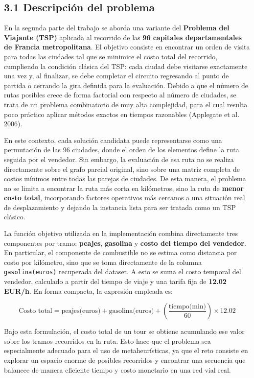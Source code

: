 \documentclass[
  12pt,
  letterpaper,
  DIV=11,
  numbers=noendperiod]{scrartcl}
\begin{document}
\subsection{3.1 Descripción del
problema}\label{descripciuxf3n-del-problema}

En la segunda parte del trabajo se aborda una variante del
\textbf{Problema del Viajante (TSP)} aplicada al recorrido de las
\textbf{96 capitales departamentales de Francia metropolitana}. El
objetivo consiste en encontrar un orden de visita para todas las
ciudades tal que se minimice el costo total del recorrido, cumpliendo la
condición clásica del TSP: cada ciudad debe visitarse exactamente una
vez y, al finalizar, se debe completar el circuito regresando al punto
de partida o cerrando la gira definida para la evaluación. Debido a que
el número de rutas posibles crece de forma factorial con respecto al
número de ciudades, se trata de un problema combinatorio de muy alta
complejidad, para el cual resulta poco práctico aplicar métodos exactos
en tiempos razonables (Applegate et al. 2006).

En este contexto, cada solución candidata puede representarse como una
permutación de las 96 ciudades, donde el orden de los elementos define
la ruta seguida por el vendedor. Sin embargo, la evaluación de esa ruta
no se realiza directamente sobre el grafo parcial original, sino sobre
una matriz completa de costos mínimos entre todas las parejas de
ciudades. De esta manera, el problema no se limita a encontrar la ruta
más corta en kilómetros, sino la ruta de \textbf{menor costo total},
incorporando factores operativos más cercanos a una situación real de
desplazamiento y dejando la instancia lista para ser tratada como un TSP
clásico.

La función objetivo utilizada en la implementación combina directamente
tres componentes por tramo: \textbf{peajes}, \textbf{gasolina} y
\textbf{costo del tiempo del vendedor}. En particular, el componente de
combustible no se estima como distancia por costo por kilómetro, sino
que se toma directamente de la columna \texttt{gasolina(euros)}
recuperada del dataset. A esto se suma el costo temporal del vendedor,
calculado a partir del tiempo de viaje y una tarifa fija de
\textbf{12.02 EUR/h}. En forma compacta, la expresión empleada es:

\[
\text{Costo total} = \text{peajes(euros)} + \text{gasolina(euros)} + \left(\frac{\text{tiempo(min)}}{60}\right)\times 12.02
\]

Bajo esta formulación, el costo total de un tour se obtiene acumulando
ese valor sobre los tramos recorridos en la ruta. Esto hace que el
problema sea especialmente adecuado para el uso de metaheurísticas, ya
que el reto consiste en explorar un espacio enorme de posibles
recorridos y encontrar una secuencia que balancee de manera eficiente
tiempo y costo monetario en una red vial real.
\end{document}
